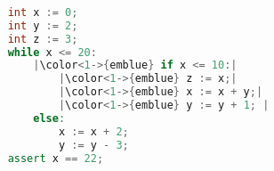 \begin{lstlisting}[language=C++,basicstyle=\ttfamily,keywordstyle=\color{blue}, escapechar={|}]  % Start your code-block
	
	int x := 0;
	int y := 2;
	int z := 3;
	while x <= 20:
		|\color<1->{emblue} if x <= 10:|
			|\color<1->{emblue} z := x;|
			|\color<1->{emblue} x := x + y;|
			|\color<1->{emblue} y := y + 1; |
		else:
			x := x + 2;
			y := y - 3;
	assert x == 22;
	\end{lstlisting}